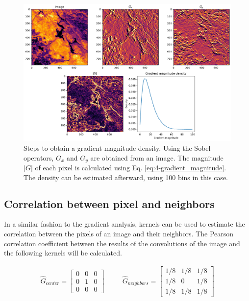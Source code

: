          \begin{figure}[H]
             \centering
             \includegraphics[width=\textwidth]{Includes/4-gradient-analysis.pdf}
             \caption{Steps to obtain a gradient magnitude density. Using the Sobel operators, $G_x$ and $G_y$ are obtained from an image. The magnitude $|G|$ of each pixel is calculated using Eq. \ref{eq:4-gradient_magnitude}. The density can be estimated afterward, using 100 bins in this case.}
             \label{fig:4-gradient-analysis}
         \end{figure}


      \subsection{Correlation between pixel and neighbors }


        In a similar fashion to the gradient analysis, kernels can be used to estimate the correlation between the pixels of an image and their neighbors. The Pearson correlation coefficient between the results of the convolutions of the image and the following kernels will be calculated.
        
        \begin{equation}
            \begin{array}{ccc}
            \hat{G}_{center} = \begin{bmatrix}
            0 & 0 & 0 \\
            0 & 1 & 0 \\
            0 & 0 & 0
            \end{bmatrix}
            &
            \quad
            &
            \hat{G}_{neighbors} = \begin{bmatrix}
             1/8 &  1/8 & 1/8 \\
             1/8 &  0 & 1/8 \\
            1/8 & 1/8 & 1/8
            \end{bmatrix}
            \end{array}
            \label{eq:4-correlation-operators}
        \end{equation}
    
